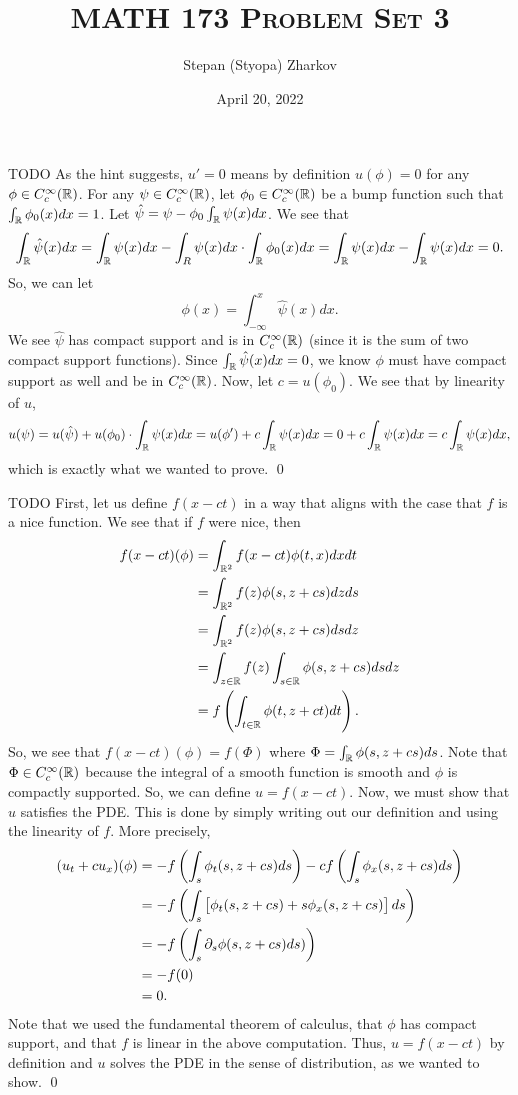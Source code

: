 \documentclass{article}
\title{\textsc{MATH 173 Problem Set 3}}
\author{Stepan (Styopa) Zharkov}
\date{April 20, 2022}
\newcommand{\Cc}{{C_c^\infty(\RR)}}
\renewcommand{\d}{\partial}
\begin{document}
\maketitle
{} TODO \tri
\hop
\solution
As the hint suggests, $u' = 0$ means by definition $u(\phi) = 0$ for any $\phi \in C_c^\infty(\mathbb{R})$. For any $\psi \in \Cc$, let $\phi_0\in \Cc$ be a bump function such that $\int_{\mathbb{R}} \phi_0(x)dx = 1$. Let $\hat{\psi} = \psi - \phi_0\int_{\mathbb{R}}\psi(x)dx$. We see that 
\[\int_{\mathbb{R}} \hat{\psi}(x)dx = \int_{\mathbb{R}} \psi(x)dx -\int_R\psi(x)dx\cdot \int_{\mathbb{R}}\phi_0(x)dx =\int_{\mathbb{R}} \psi(x)dx-\int_{\mathbb{R}} \psi(x)dx = 0.\]
So, we can let 
\[\phi(x) = \int_{-\infty}^x \hat{\psi}(x) dx.\]
We see $\hat{\psi}$ has compact support and is in $\Cc$ (since it is the sum of two compact support functions). Since $\int_{\mathbb{R}} \hat{\psi}(x)dx = 0$, we know $\phi$ must have compact support as well and be in $\Cc$. Now, let $c = u(\phi_0)$. We see that by linearity of $u$,
\[u(\psi) = u(\hat{\psi}) + u(\phi_0)\cdot \int_{\mathbb{R}}\psi(x)dx = u(\phi') + c\int_{\mathbb{R}}\psi(x)dx =0+  c\int_{\mathbb{R}}\psi(x)dx=c\int_{\mathbb{R}}\psi(x)dx, \]
which is exactly what we wanted to prove. 
\qed


\newpage
{}TODO
\tri
\hop
\solution
First, let us define $f(x-ct)$ in a way that aligns with the case that $f$ is a nice function. We see that if $f$ were nice, then
\begin{align*}
    f(x-ct)(\phi)&= \int_{\RR^2}f(x-ct)\phi(t,x)dxdt \\
    &= \int_{\RR^2}f(z)\phi(s,z+cs)dzds \\
    &= \int_{\RR^2}f(z)\phi(s,z+cs)dsdz \\
    & = \int_{z \in \RR} f(z) \int_{s \in \RR} \phi(s,z+cs)ds dz\\
    &= f\del{\int_{t \in \RR}\phi(t,z+ct)dt}. 
\end{align*}
So, we see that $f(x-ct)(\phi) = f(\Phi)$ where $\Phi = \int_{\mathbb{R}} \phi(s,z+cs)ds$. Note that $\Phi \in \Cc$ because the integral of a smooth function is smooth and $\phi$ is compactly supported. So, we can define $u = f(x-ct)$. 
\hop 
Now, we must show that $u$ satisfies the PDE. This is done by simply writing out our definition and using the linearity of $f$. More precisely, 
\begin{align*}
    (u_t + cu_x)(\phi) &= -f\del{\int_s \phi_t(s, z +cs) ds} -cf\del{\int_s \phi_x(s, z +cs) ds} \\
    &= -f\del{\int_s \sbr{\phi_t(s, z +cs) +s\phi_x(s, z +cs)} ds} \\
    & = -f\del{\int_s\d_s \phi(s,z+cs) ds)}\\
    &= -f(0) \\
    &= 0.
\end{align*} 
Note that we used the fundamental theorem of calculus, that $\phi$ has compact support, and that $f$ is linear in the above computation. 
\hop 
Thus, $u = f(x-ct)$ by definition and $u$ solves the PDE in the sense of distribution, as we wanted to show.
\qed
\end{document}
